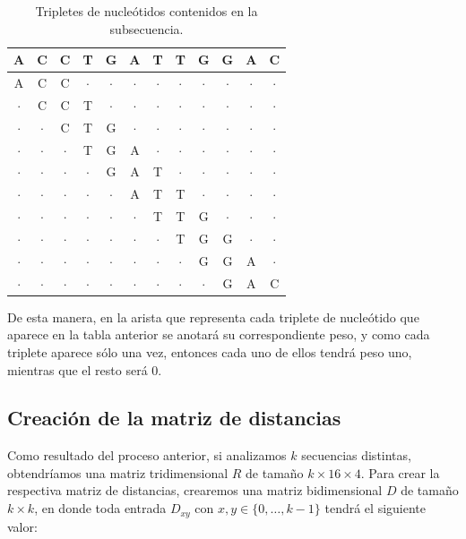 \documentclass[12pt]{article}
\begin{document}
\begin{table}[h!]
  \centering
  \begin{tabular}{cccccccccccc}
    A & C & C & T & G & A & T & T & G & G & A & C\\
    \midrule
    A & C & C & $\cdot$ & $\cdot$ & $\cdot$ & $\cdot$ & $\cdot$ & $\cdot$ & $\cdot$ & $\cdot$ & $\cdot$\\
    $\cdot$ & C & C & T & $\cdot$ & $\cdot$ & $\cdot$ & $\cdot$ & $\cdot$ & $\cdot$ & $\cdot$ & $\cdot$\\
    $\cdot$ & $\cdot$ & C & T & G & $\cdot$ & $\cdot$ & $\cdot$ & $\cdot$ & $\cdot$ & $\cdot$ & $\cdot$\\
    $\cdot$ & $\cdot$ & $\cdot$ & T & G & A & $\cdot$ & $\cdot$ & $\cdot$ & $\cdot$ & $\cdot$ & $\cdot$\\
    $\cdot$ & $\cdot$ & $\cdot$ & $\cdot$ & G & A & T & $\cdot$ & $\cdot$ & $\cdot$ & $\cdot$ & $\cdot$\\
    $\cdot$ & $\cdot$ & $\cdot$ & $\cdot$ & $\cdot$ & A & T & T & $\cdot$ & $\cdot$ & $\cdot$ & $\cdot$\\
    $\cdot$ & $\cdot$ & $\cdot$ & $\cdot$ & $\cdot$ & $\cdot$ & T & T & G & $\cdot$ & $\cdot$ & $\cdot$\\
    $\cdot$ & $\cdot$ & $\cdot$ & $\cdot$ & $\cdot$ & $\cdot$ & $\cdot$ & T & G & G & $\cdot$ & $\cdot$\\
    $\cdot$ & $\cdot$ & $\cdot$ & $\cdot$ & $\cdot$ & $\cdot$ & $\cdot$ & $\cdot$ & G & G & A & $\cdot$\\
    $\cdot$ & $\cdot$ & $\cdot$ & $\cdot$ & $\cdot$ & $\cdot$ & $\cdot$ & $\cdot$ & $\cdot$ & G & A & C\\
  \end{tabular}
  \caption{Tripletes de nucleótidos contenidos en la subsecuencia.}
\end{table}

De esta manera, en la arista que representa cada triplete de nucleótido que aparece en la tabla anterior se anotará su correspondiente peso, y como cada triplete aparece sólo una vez, entonces cada uno de ellos tendrá peso uno, mientras que el resto será 0.

\subsection{Creación de la matriz de distancias}

\noindent Como resultado del proceso anterior, si analizamos $k$ secuencias distintas, obtendríamos una matriz tridimensional $R$ de tamaño $k\times 16\times 4$. Para crear la respectiva matriz de distancias, crearemos una matriz bidimensional $D$ de tamaño $k\times k$, en donde toda entrada $D_{xy}$ con $x,y\in\{0,\ldots,k-1\}$ tendrá el siguiente valor:
\end{document}
